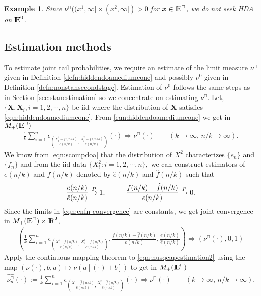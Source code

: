 \documentclass[11 pt]{amsart}
\newtheorem{ex}[thm]{Example}
\numberwithin{equation}{section}
\begin{document}
{{\begin{ex}
{{Since $\nu^{\sqcap}((x^1,
\infty] \times(x^2, \infty]) > 0$ for ${\boldsymbol x} \in {\mathop{\rm I\kern -0.20em E}\nolimits}^{\sqcap}$, we do
not seek HDA on ${\mathop{\rm I\kern -0.20em E}\nolimits}^0$.}
}
\end{ex}

\subsection{Estimation methods}\label{sec:nonstanestimation}
To estimate joint tail probabilities, we
{require an estimate of}
the limit measure $\nu^{\sqcap}$  given in Definition
\ref{defn:hiddendoamediumcone} {and possibly} $\nu^0$ given in Definition
\ref{defn:nonstansecondstage}. {E}stimation of $\nu^0$ follows the
same steps {as}  in Section \ref{sec:stanestimation} {s}o we
concentrate {on}  {estimating} $\nu^{\sqcap}$. Let, $\{ {\boldsymbol X},
{\boldsymbol X}_i, i = 1, 2, \cdots, n \}$ be iid where the distribution of
${\boldsymbol X}$ satisfies \eqref{eqn:hiddendoamediumcone}. From
\eqref{eqn:hiddendoamediumcone} we get \citep[page
139]{resnickbook:2007}  {i}n $M_+({\mathop{\rm I\kern -0.20em E}\nolimits}^{\sqcap})$
\begin{align}\label{eqn:nusqcapestimation1}
\frac{1}{k} \sum_{i=1}^n \epsilon_{\left( \frac{X^1_i -
      f(n/k)}{e(n/k)}, \frac{X^2_i - f(n/k)}{e(n/k)}\right)}(\cdot)
\Rightarrow \nu^{\sqcap}(\cdot)  \qquad (k \to \infty, \,n/k
\to \infty).
\end{align}
{We know} from \eqref{eqn:scompdoa} that the distribution of
 $X^2$ characterizes $\{ e_n \}$ and $\{ f_n \}$ and from the iid data
 $\{ X^2_i: i = 1, 2, \cdots, n \},$ we {can construct} estimat{ors} of
 $e(n/k)$ and $f(n/k)$ denoted by $\hat e(n/k)$ and $\hat f(n/k)$  \citep[page 93]{resnickbook:2007}
 such that  
\begin{align}\label{eqn:enfn convergence}
\frac{e(n/k)}{\hat e(n/k)} \stackrel{P}{\rightarrow} 1, \hskip 1 cm \frac{f(n/k) - \hat f(n/k)}{e(n/k)} \stackrel{P}{\rightarrow} 0.
\end{align}
{Since the limits in \eqref{eqn:enfn convergence} are
  constants,}
we get  joint convergence in $M_+({\mathop{\rm I\kern -0.20em E}\nolimits}^{\sqcap}) \times {\mathop{\rm I\kern -0.20em R}\nolimits}^2$,
\begin{align}\label{eqn:nusqcapestimation2}
\left( \frac{1}{k} \sum_{i=1}^n \epsilon_{\left( \frac{X^1_i -
        f(n/k)}{e(n/k)}, \frac{X^2_i - f(n/k)}{e(n/k)}\right)},
  \frac{f(n/k) - \hat f(n/k)}{e(n/k)}, \frac{e(n/k)}{\hat e(n/k)}
\right) \Rightarrow \left( \nu^{\sqcap}(\cdot), 0, 1 \right)  
\end{align}
{Apply the continuous mapping theorem to {\eqref{eqn:nusqcapestimation2}} using the map}
 $(\nu(\cdot), b, a) \mapsto \nu(a [ (\cdot) + b] )$ to get in $M_+({\mathop{\rm I\kern -0.20em E}\nolimits}^{\sqcap})$ 
\begin{align}\label{eqn:nsqcapestimate}  
{\widehat{\nu_n^\sqcap}(\cdot):=}
  \frac{1}{k} \sum_{i=1}^n \epsilon_{\left( \frac{X^1_i - \hat
      f(n/k)}{\hat e(n/k)}, \frac{X^2_i - \hat f(n/k)}{\hat
      e(n/k)}\right)}(\cdot) \Rightarrow \nu^{\sqcap}(\cdot)\qquad
(k \to \infty,\, n/k \to
\infty).
\end{align}

}}
\end{document}
